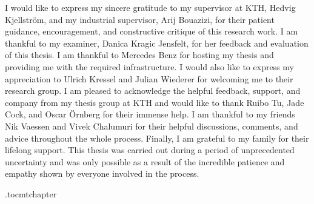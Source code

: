 I would like to express my sincere gratitude to my supervisor at KTH, Hedvig Kjellström, and my industrial supervisor, Arij Bouazizi, for their patient guidance, encouragement, and constructive critique of this research work. I am thankful to my examiner, Danica Kragic Jensfelt, for her feedback and evaluation of this thesis. I am thankful to Mercedes Benz for hosting my thesis and providing me with the required infrastructure. I would also like to express my appreciation to Ulrich Kressel and Julian Wiederer for welcoming me to their research group. I am pleased to acknowledge the helpful feedback, support, and company from my thesis group at KTH and would like to thank Ruibo Tu, Jade Cock, and Oscar Örnberg for their immense help. I am thankful to my friends Nik Vaessen and Vivek Chalumuri for their helpful discussions, comments, and advice throughout the whole process. Finally, I am grateful to my family for their lifelong support. This thesis was carried out during a period of unprecedented uncertainty and was only possible as a result of the incredible patience and empathy shown by everyone involved in the process.

\newpage



\newpage

\etocdepthtag.toc{mtchapter}
\thispagestyle{plain}
\tableofcontents

\newpage


